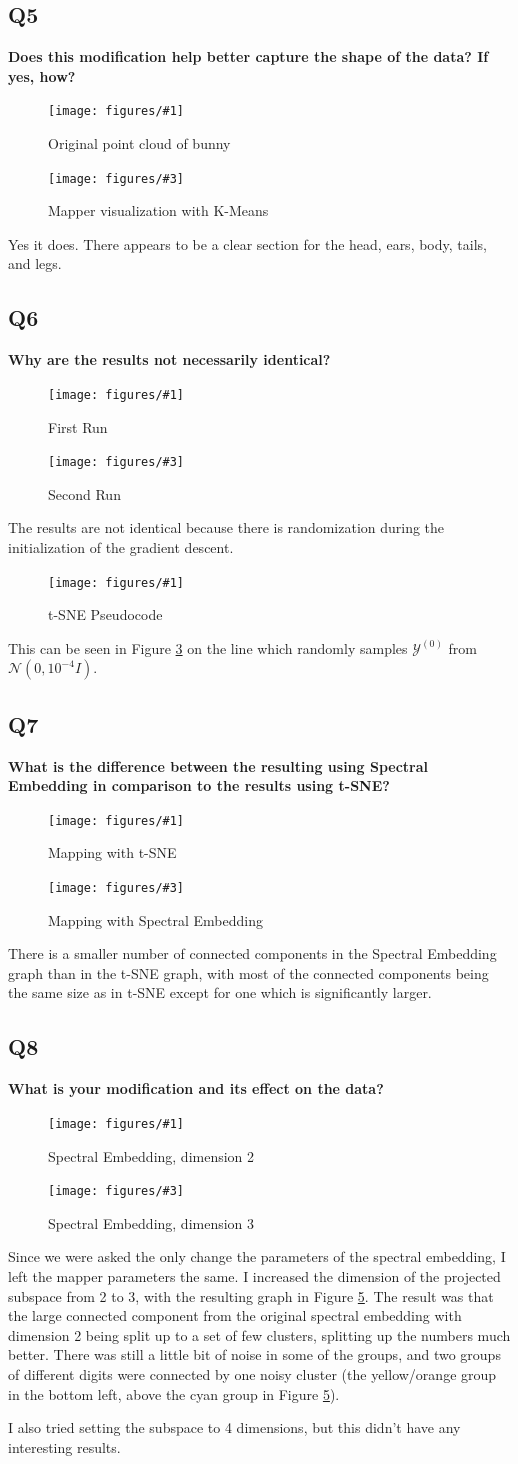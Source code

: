 \documentclass[12pt]{article}
\newcommand{\problem}[2]{
	\subsection*{#1}
	\textbf{#2}
}
\newcommand{\image}[3]{
\begin{figure}[H]
	\centering
	\texttt{[image: figures/\#1]}
	\caption{#2}
	\label{#1}
\end{figure}
}
\newcommand{\doubleimage}[5]{
\begin{figure}[H]
	\centering
	\begin{minipage}{#5\textwidth}
		\centering
		\texttt{[image: figures/\#1]}
		\caption{#2}
		\label{#1}
	\end{minipage}%
	\begin{minipage}{#5\textwidth}
		\centering
		\texttt{[image: figures/\#3]}
		\caption{#4}
		\label{#3}
	\end{minipage}
\end{figure}
}
\begin{document}
\problem{Q5}{Does this modification help better capture the shape of the data? If yes, how?}

\doubleimage{q3-bunny}{Original point cloud of bunny}{q5-kmeans}{Mapper visualization with K-Means}{0.5}

Yes it does. There appears to be a clear section for the head, ears, body, tails, and legs. 

\problem{Q6}{Why are the results not necessarily identical?}

\doubleimage{q6-first}{First Run}{q6-second}{Second Run}{0.5}

The results are not identical because there is randomization during the initialization of the gradient descent. 

\image{q6-tsne}{t-SNE Pseudocode}{0.35}

This can be seen in Figure \ref{q6-tsne} on the line which randomly samples $\mathcal{Y}^{(0)}$ from $\mathcal{N}(0, 10^{-4} I)$. 


\problem{Q7}{What is the difference between the resulting using Spectral Embedding in comparison to the results using t-SNE?}

\doubleimage{q6-first}{Mapping with t-SNE}{q7-spectral}{Mapping with Spectral Embedding}{0.5}

There is a smaller number of connected components in the Spectral Embedding graph than in the t-SNE graph, with most of the connected components being the same size as in t-SNE except for one which is significantly larger. 


\problem{Q8}{What is your modification and its effect on the data?}
\doubleimage{q7-spectral}{Spectral Embedding, dimension 2}{q8-spectral3}{Spectral Embedding, dimension 3}{0.5}

Since we were asked the only change the parameters of the spectral embedding, I left the mapper parameters the same. I increased the dimension of the projected subspace from 2 to 3, with the resulting graph in Figure \ref{q8-spectral3}. The result was that the large connected component from the original spectral embedding with dimension 2 being split up to a set of few clusters, splitting up the numbers much better. There was still a little bit of noise in some of the groups, and two groups of different digits were connected by one noisy cluster (the yellow/orange group in the bottom left, above the cyan group in Figure \ref{q8-spectral3}).

I also tried setting the subspace to 4 dimensions, but this didn't have any interesting results.
\end{document}
